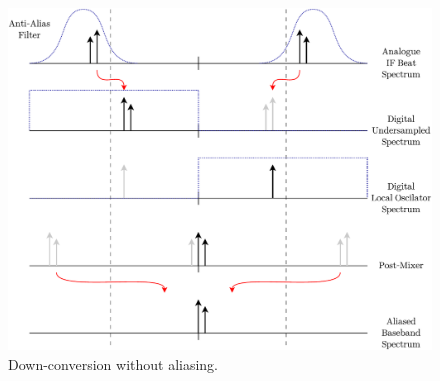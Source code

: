 \documentclass[a4paper,11pt]{report}
\begin{document}
\begin{figure}[h!]
    \begin{center}
        \includegraphics[width=\textwidth]{images/anti_alias_down_conversion}
        \caption{Down-conversion without aliasing.}
        \label{fig:anti_alias_down_conversion}
    \end{center}
\end{figure}
\end{document}
